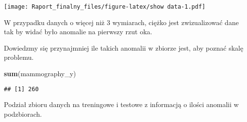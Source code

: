 \documentclass[
]{article}
\newenvironment{Shaded}{\begin{snugshade}}{\end{snugshade}}
\newcommand{\DataTypeTok}[1]{\textcolor[rgb]{0.13,0.29,0.53}{#1}}
\newcommand{\DecValTok}[1]{\textcolor[rgb]{0.00,0.00,0.81}{#1}}
\newcommand{\FloatTok}[1]{\textcolor[rgb]{0.00,0.00,0.81}{#1}}
\newcommand{\KeywordTok}[1]{\textcolor[rgb]{0.13,0.29,0.53}{\textbf{#1}}}
\newcommand{\NormalTok}[1]{#1}
\newcommand{\OperatorTok}[1]{\textcolor[rgb]{0.81,0.36,0.00}{\textbf{#1}}}
\newcommand{\OtherTok}[1]{\textcolor[rgb]{0.56,0.35,0.01}{#1}}
\newcommand{\StringTok}[1]{\textcolor[rgb]{0.31,0.60,0.02}{#1}}
\begin{document}
\texttt{[image: Raport\_finalny\_files/figure-latex/show data-1.pdf]}

W przypadku danych o więcej niż 3 wymiarach, ciężko jest zwizualizować
dane tak by widać było anomalie na pierwszy rzut oka.

Dowiedzmy się przynajmniej ile takich anomalii w zbiorze jest, aby
poznać skalę problemu.

\begin{Shaded}
\begin{Highlighting}[]
\KeywordTok{sum}\NormalTok{(mammography_y)}
\end{Highlighting}
\end{Shaded}

\begin{verbatim}
## [1] 260
\end{verbatim}

Podział zbioru danych na treningowe i testowe z informacją o ilości
anomalii w podzbiorach.

\begin{Shaded}
\end{Shaded}
\end{document}
